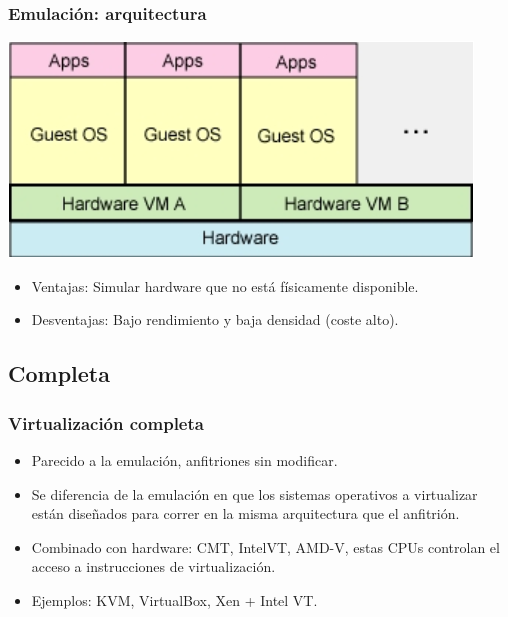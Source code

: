 \documentclass{beamer}
\begin{document}
\begin{frame}
\frametitle{Emulación: arquitectura}
\begin{center}
\includegraphics[scale=0.35,clip=false]{figs/emulation.png}
\end{center}

\begin{itemize}
\item \alert{Ventajas:} Simular hardware que no está físicamente disponible.
\item \alert{Desventajas:} Bajo rendimiento y baja densidad (coste alto).
\end{itemize}


\end{frame}



\subsection{Completa}


\begin{frame}
\frametitle{Virtualización completa}

\begin{itemize}
\item Parecido a la emulación, anfitriones sin modificar.
\item Se diferencia de la emulación en que los sistemas operativos a virtualizar están diseñados para correr en la misma arquitectura que el anfitrión.
\item Combinado con hardware: CMT, IntelVT, AMD-V, estas CPUs controlan el acceso a instrucciones de virtualización.
\item \alert{Ejemplos:} KVM, VirtualBox, Xen + Intel VT. 
\end{itemize}
\end{frame}
\end{document}
